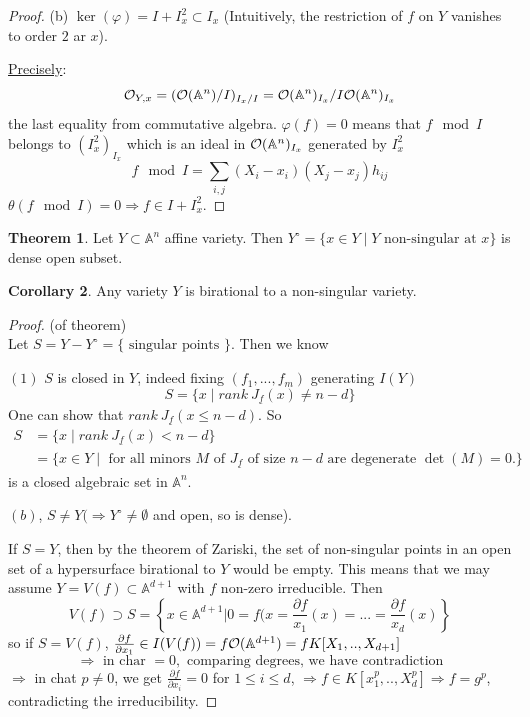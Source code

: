 \documentclass[11pt]{article}
\theoremstyle{definition}
\newtheorem{thm}{Theorem}[section]
\newtheorem{cor}[thm]{Corollary}
\newcommand{\affn}{\mathbb A}
\newcommand{\calo}{{\cal O}}
\newcommand{\pd}{\partial}
\newcommand{\Lrta}{\Longrightarrow}
\begin{document}
\begin{proof}
	(b) $\ker(\varphi)=I+I_x^2\subset I_x$ (Intuitively, the restriction of $f$ on $Y$ vanishes to order $2$ ar $x$). 
	
	\underline{Precisely}: 
	$$
	\calo_{Y,x}=(\calo(\affn^n)/I)_{I_x/I}=\calo(\affn^n)_{I_x}/I\calo(\affn^n)_{I_x}
	$$
	the last equality from commutative algebra. $\varphi(f)=0$ means that $f\mod I$ belongs to $(I_x^2)_{I_x}$ which is an ideal in $\calo(\affn^n)_{I_x}$ generated by $I_x^2$
	$$
	f\mod I=\sum_{i,j}(X_i-x_i)(X_j-x_j)h_{ij}
	$$
	$\theta(f\mod I)=0\Lrta f\in I+I_x^2$.
\end{proof}

\begin{thm}
Let $Y\subset \affn^n$ affine variety. Then $Y^\circ =\{x\in Y\mid Y\text{ non-singular at } x\}$  is dense open subset.
\end{thm}
\begin{cor}
Any variety $Y$ is birational to a non-singular variety.
\end{cor}
\begin{proof}
(of theorem)\\
Let $S=Y-Y^\circ=\{\text{ singular points }\}$. Then we know

$(1)$ $S$ is closed in $Y$, indeed fixing $(f_1,...,f_m)$ generating $I(Y)$
$$
S=\{x\mid rank\  J_{\underline{f}}(x)\neq n-d\} 
$$
One can show that $rank\ J_{\underline{f}}(x\leq n-d)$. So
$$
\begin{aligned}
S&=\{x\mid rank\  J_{\underline{f}}(x)< n-d\}\\
&=\{x\in Y\mid \text{ for all minors $M$ of $J_{\underline{f}}$ of size $n-d$ are degenerate $\det (M)=0$.}\}
\end{aligned}
$$
is a closed algebraic set in $\affn^n$.

$(b)$, $S\neq Y(\Lrta Y^\circ\neq \emptyset$ and open, so is dense). 

If $S=Y$, then by the theorem of Zariski, the set of non-singular points in an open set of a hypersurface birational to $Y$ would be empty. This means that we may assume $Y=V(f)\subset \affn^{d+1}$ with $f$ non-zero irreducible.
 Then 
 $$
V(f)\supset S=\left\{x\in \affn^{d+1}|0=f(x=\frac{\pd f}{x_1}(x)=...=\frac{\pd f}{x_d}(x)\right\}
 $$
 so if $S=V(f)$, $\frac{\pd f}{\pd x_1}\in I(V(f))=f\calo(\affn^{d+1})=f K[X_1,..,X_{d+1}]$
 $$
\Lrta \text{ in char }=0, \text{ comparing degrees, we have contradiction}
 $$
 $\Lrta$ in chat $p\neq 0$, we get $\frac{\pd f}{\pd x_i}=0$ for $1\leq i\leq d$,
 $\Lrta f\in K[x_1^p,..,X_d^{p}]\Lrta f=g^p$, contradicting the irreducibility.
\end{proof}
\end{document}
